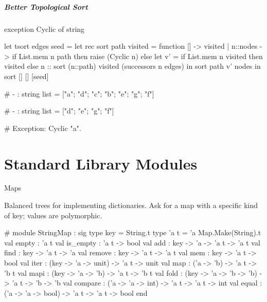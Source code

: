 \documentclass{plt}
\begin{document}
\begin{frame}[fragile]
  \frametitle{Better Topological Sort}

\begin{ocaml}
exception Cyclic of string

let tsort edges seed =
  let rec sort path visited = function
     []       -> visited
  |  n::nodes ->
     if List.mem n path then raise (Cyclic n) else
     let v' = if List.mem n visited then visited else
              n :: sort (n::path) visited (successors n edges)
     in sort path v' nodes
  in
  sort [] [] [seed]
\end{ocaml}

\begin{interactive}
# 
- : string list = ["a"; "d"; "c"; "b"; "e"; "g"; "f"]

# 
- : string list = ["d"; "e"; "g"; "f"]

# 
Exception: Cyclic "a".
\end{interactive}

\end{frame}

\part{Standard Library Modules}
\frame{\partpage}


\begin{frame}[fragile]{Maps}

Balanced trees for implementing dictionaries.  Ask for a map with a
specific kind of key; values are polymorphic.

\begin{interactive}
# 
module StringMap :
  sig
    type key = String.t
    type 'a t = 'a Map.Make(String).t
    val empty : 'a t
    val is_empty : 'a t -> bool
    val add : key -> 'a -> 'a t -> 'a t
    val find : key -> 'a t -> 'a
    val remove : key -> 'a t -> 'a t
    val mem : key -> 'a t -> bool
    val iter : (key -> 'a -> unit) -> 'a t -> unit
    val map : ('a -> 'b) -> 'a t -> 'b t
    val mapi : (key -> 'a -> 'b) -> 'a t -> 'b t
    val fold : (key -> 'a -> 'b -> 'b) -> 'a t -> 'b -> 'b
    val compare : ('a -> 'a -> int) -> 'a t -> 'a t -> int
    val equal : ('a -> 'a -> bool) -> 'a t -> 'a t -> bool
  end
\end{interactive}

\end{frame}
\end{document}
